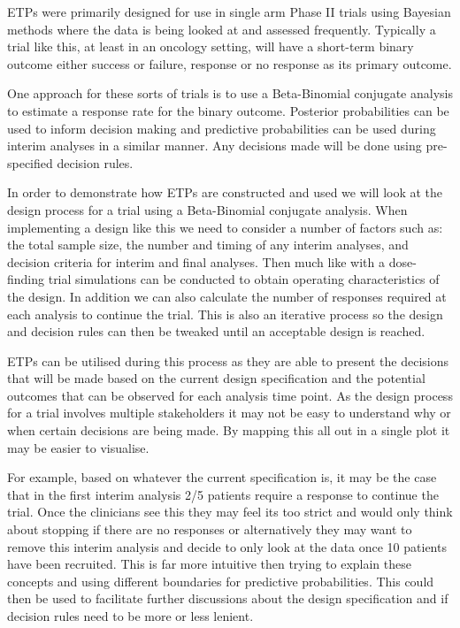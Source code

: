 ETPs were primarily designed for use in single arm Phase \RN{2} trials using Bayesian methods where the data is being looked at and assessed frequently. Typically a trial like this, at least in an oncology setting, will have a short-term binary outcome either success or failure, response or no response as its primary outcome. 

One approach for these sorts of trials is to use a Beta-Binomial conjugate analysis to estimate a response rate for the binary outcome. Posterior probabilities can be used to inform decision making and predictive probabilities can be used during interim analyses in a similar manner. Any decisions made will be done using pre-specified decision rules.

In order to demonstrate how ETPs are constructed and used we will look at the design process for a trial using a Beta-Binomial conjugate analysis. When implementing a design like this we need to consider a number of factors such as: the total sample size, the number and timing of any interim analyses, and decision criteria for interim and final analyses. Then much like with a dose-finding trial simulations can be conducted to obtain operating characteristics of the design. In addition we can also calculate the number of responses required at each analysis to continue the trial. This is also an iterative process so the design and decision rules can then be tweaked until an acceptable design is reached. 

ETPs can be utilised during this process as they are able to present the decisions that will be made based on the current design specification and the potential outcomes that can be observed for each analysis time point. As the design process for a trial involves multiple stakeholders it may not be easy to understand why or when certain decisions are being made. By mapping this all out in a single plot it may be easier to visualise. 

For example, based on whatever the current specification is, it may be the case that in the first interim analysis 2/5 patients require a response to continue the trial. Once the clinicians see this they may feel its too strict and would only think about stopping if there are no responses or alternatively they may want to remove this interim analysis and decide to only look at the data once 10 patients have been recruited. This is far more intuitive then trying to explain these concepts and using different boundaries for predictive probabilities. This could then be used to facilitate further discussions about the design specification and if decision rules need to be more or less lenient.  

